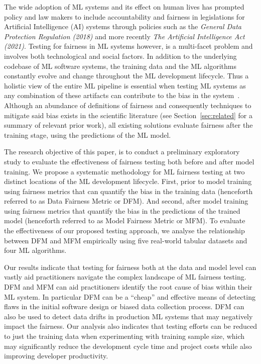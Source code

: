 \documentclass{article}
\begin{document}
The wide adoption of ML systems and its effect on human lives has
prompted policy and law makers to include accountability and fairness
in legislations for Artificial Intelligence (AI) systems through
policies such as the \emph{General Data Protection Regulation (2018)}
and more recently \emph{The Artificial Intelligence Act (2021)}.
Testing for fairness in ML systems however, is a multi-facet problem
and involves both technological and social factors. In addition to the
underlying codebase of ML software systems, the training data and the
ML algorithms constantly evolve and change throughout the ML
development lifecycle. Thus a holistic view of the entire ML pipeline
is essential when testing ML systems as any combination of these
artifacts can contribute to the bias in the
system \cite{sculley2015hidden,bosch2021engineering,hutchinson2021towards,sato2019continuous}.
Although an abundance of definitions of fairness and consequently
techniques to mitigate said bias exists in the scientific literature
(see Section \ref{sec:related} for a summary of relevant prior work),
all existing solutions evaluate fairness after the training stage,
using the predictions of the ML model.

The research objective of this paper, is to conduct a preliminary
exploratory study to evaluate the effectiveness of fairness testing
both before and after model training. We propose a systematic
methodology for ML fairness testing at two distinct locations of the
ML development lifecycle. First, prior to model training using
fairness metrics that can quantify the bias in the training data
(henceforth referred to as Data Fairness Metric or DFM). And second,
after model training using fairness metrics that quantify the bias in
the predictions of the trained model (henceforth referred to as Model
Fairness Metric or MFM). To evaluate the effectiveness of our proposed
testing approach, we analyse the relationship between DFM and MFM
empirically using five real-world tabular datasets and four ML
algorithms.


Our results indicate that testing for fairness both at the data and
model level can vastly aid practitioners navigate the complex
landscape of ML fairness testing. DFM and MFM can aid practitioners
identify the root cause of bias within their ML system. In particular
DFM can be a ``cheap'' and effective means of detecting flaws in the
initial software design or biased data collection process. DFM can
also be used to detect data drifts in production ML systems that may
negatively impact the fairness. Our analysis also indicates that
testing efforts can be reduced to just the training data when
experimenting with training sample size, which may significantly
reduce the development cycle time and project costs while also
improving developer productivity.
\end{document}
